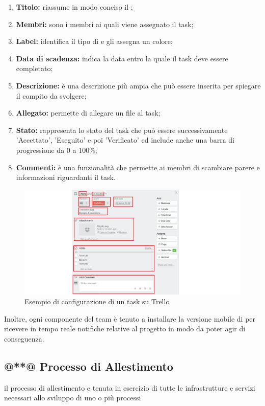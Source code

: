 \documentclass[a4paper,11pt]{article}
\begin{document}
	
		\begin{enumerate}
		\item \textbf{Titolo:} riassume in modo conciso il ;
		\item \textbf{Membri:} sono i membri ai quali viene assegnato il task;
		\item \textbf{Label:} identifica il tipo di  e gli assegna un colore;
		\item \textbf{Data di scadenza:} indica la data entro la quale il task deve essere completato;
		\item \textbf{Descrizione:} è una descrizione più ampia che può essere inserita per spiegare il compito da svolgere;
		\item \textbf{Allegato:} permette di allegare un file al task;
		\item \textbf{Stato:} rappresenta lo stato del task che può essere successivamente 'Accettato', 'Eseguito' e poi 'Verificato' ed include anche una barra di progressione da 0 a 100\%; 
		\item \textbf{Commenti:} è una funzionalità che permette ai membri di scambiare parere e informazioni riguardanti il task.
		
	
		\end{enumerate}
		\begin{figure}[htbp]
		\centering
		\includegraphics[scale=0.50]{../images/tuto2.png}
		\caption{Esempio di configurazione di un task su Trello}			
			
		\end{figure}
			Inoltre, ogni componente del team è tenuto a installare la versione mobile di  per ricevere in tempo reale notifiche relative al progetto in modo da poter agir di conseguenza.


	
		\subsection{@**@ Processo di Allestimento}
		il processo di allestimento e tenuta in esercizio di tutte le
infrastrutture e servizi necessari allo sviluppo di uno o più
processi
\end{document}
